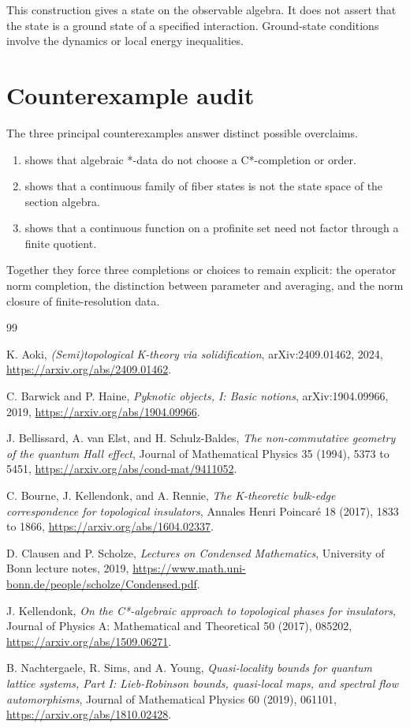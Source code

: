 \documentclass[12pt]{article}
\theoremstyle{definition}
\theoremstyle{remark}
\begin{document}
This construction gives a state on the observable algebra.  It does not assert that
the state is a ground state of a specified interaction.  Ground-state conditions
involve the dynamics or local energy inequalities.

\section{Counterexample audit}

The three principal counterexamples answer distinct possible overclaims.

\begin{enumerate}[leftmargin=2em]
\item {} shows that algebraic *-data do not choose a C*-completion or
  order.
\item {} shows that a continuous family of fiber states is not the
  state space of the section algebra.
\item {} shows that a continuous function on a profinite set need not
  factor through a finite quotient.
\end{enumerate}

Together they force three completions or choices to remain explicit: the operator
norm completion, the distinction between parameter and averaging, and the norm
closure of finite-resolution data.

\begin{thebibliography}{99}

K. Aoki,
\emph{(Semi)topological K-theory via solidification},
arXiv:2409.01462, 2024,
\url{https://arxiv.org/abs/2409.01462}.

C. Barwick and P. Haine,
\emph{Pyknotic objects, I: Basic notions},
arXiv:1904.09966, 2019,
\url{https://arxiv.org/abs/1904.09966}.

J. Bellissard, A. van Elst, and H. Schulz-Baldes,
\emph{The non-commutative geometry of the quantum Hall effect},
Journal of Mathematical Physics 35 (1994), 5373 to 5451,
\url{https://arxiv.org/abs/cond-mat/9411052}.

C. Bourne, J. Kellendonk, and A. Rennie,
\emph{The K-theoretic bulk-edge correspondence for topological insulators},
Annales Henri Poincar\'e 18 (2017), 1833 to 1866,
\url{https://arxiv.org/abs/1604.02337}.

D. Clausen and P. Scholze,
\emph{Lectures on Condensed Mathematics},
University of Bonn lecture notes, 2019,
\url{https://www.math.uni-bonn.de/people/scholze/Condensed.pdf}.

J. Kellendonk,
\emph{On the C*-algebraic approach to topological phases for insulators},
Journal of Physics A: Mathematical and Theoretical 50 (2017), 085202,
\url{https://arxiv.org/abs/1509.06271}.

B. Nachtergaele, R. Sims, and A. Young,
\emph{Quasi-locality bounds for quantum lattice systems, Part I: Lieb-Robinson
bounds, quasi-local maps, and spectral flow automorphisms},
Journal of Mathematical Physics 60 (2019), 061101,
\url{https://arxiv.org/abs/1810.02428}.

\end{thebibliography}
\end{document}
